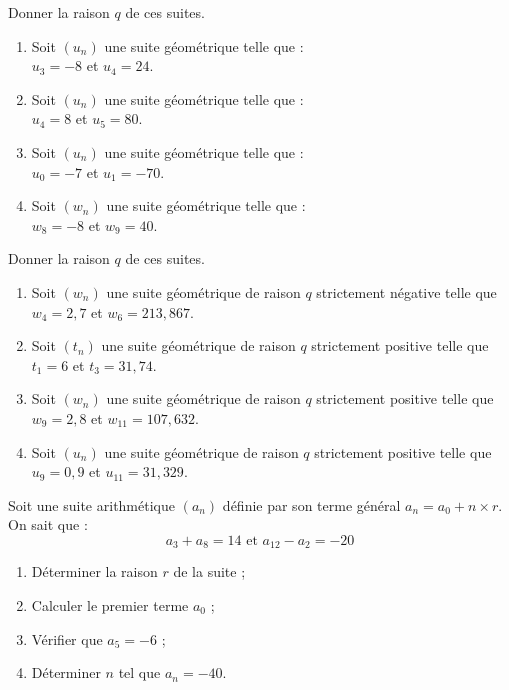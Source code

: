 \documentclass[11pt]{article}
\begin{document}
\begin{multicols}{2}
\begin{exercice}[1]
Donner la raison $q$ de ces suites.
\begin{enumerate}
\item Soit $(u_n)$ une suite géométrique  telle que :\\
$u_{3}=-8$ et $u_{4}=24$.
\item Soit $(u_n)$ une suite géométrique  telle que :\\
$u_{4}=8$ et $u_{5}=80$.
\item Soit $(u_n)$ une suite géométrique  telle que :\\
$u_{0}=-7$ et $u_{1}=-70$.
\item Soit $(w_n)$ une suite géométrique  telle que :\\
$w_{8}=-8$ et $w_{9}=40$.
\end{enumerate}
\end{exercice}

\begin{exercice}[2]
Donner la raison $q$ de ces suites.
\begin{enumerate}
\item Soit $(w_n)$ une suite géométrique de raison $q$ strictement négative telle que $w_{4}=2{,}7$ et $w_{6}=213{,}867$.
\item Soit $(t_n)$ une suite géométrique de raison $q$ strictement positive telle que $t_{1}=6$ et $t_{3}=31{,}74$.
\item Soit $(w_n)$ une suite géométrique de raison $q$ strictement positive telle que $w_{9}=2{,}8$ et $w_{11}=107{,}632$.
\item Soit $(u_n)$ une suite géométrique de raison $q$ strictement positive telle que $u_{9}=0{,}9$ et $u_{11}=31{,}329$.
\end{enumerate}
\end{exercice}
\end{multicols}

\begin{exercice}[3][Problème]
Soit une suite arithmétique $(a_n)$ définie par son terme général
$a_n=a_0+n\times r$. On sait que :
\[ a_3 + a_8 = 14 \text{ et } a_{12} - a_2 = -20 \]
\begin{multicols}{2}
\begin{enumerate}
\item Déterminer la raison $r$ de la suite ;
\item Calculer le premier terme $a_0$ ;
\item Vérifier que $a_5= -6$ ;
\item Déterminer $n$ tel que $a_n = -40$.
\end{enumerate}
\end{multicols}
\end{exercice}
\end{document}
